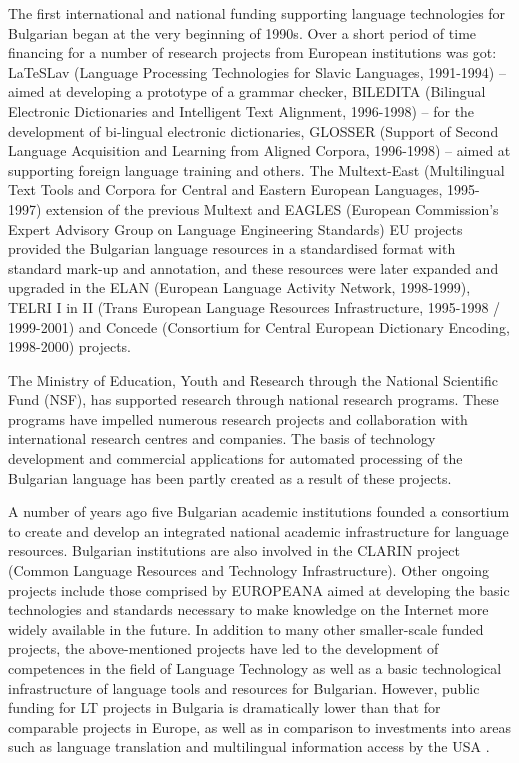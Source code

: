 \begin{multicols}{2}
The first international and national funding supporting language technologies for Bulgarian began at the very beginning of 1990s. Over a short period of time financing for a number of research projects from European institutions was got: LaTeSLav (Language Processing Technologies for Slavic Languages, 1991-1994) – aimed at developing a prototype of a grammar checker, BILEDITA (Bilingual Electronic Dictionaries and Intelligent Text Alignment, 1996-1998) – for the development of bi-lingual electronic dictionaries, GLOSSER (Support of Second Language Acquisition and Learning from Aligned Corpora, 1996-1998) – aimed at supporting foreign language training and others. The Multext-East (Multilingual Text Tools and Corpora for Central and Eastern European Languages, 1995-1997) extension of the previous Multext and EAGLES (European Commission's Expert Advisory Group on Language Engineering Standards) EU projects provided the Bulgarian language resources in a standardised format
  with standard mark-up and annotation, and these resources were later expanded and upgraded in the ELAN (European Language Activity Network, 1998-1999), TELRI I in II (Trans European Language Resources Infrastructure, 1995-1998 / 1999-2001) and Concede (Consortium for Central European Dictionary Encoding, 1998-2000) projects.

The Ministry of Education, Youth and Research through the National Scientific Fund (NSF), has supported research through national research programs. These programs have impelled numerous research projects and collaboration with international research centres and companies. The basis of technology development and commercial applications for automated processing of the Bulgarian language has been partly created as a result of these projects.

A number of years ago five Bulgarian academic institutions founded a consortium to create and develop an integrated national academic infrastructure for language resources. Bulgarian institutions are also involved in the CLARIN project (Common Language Resources and Technology Infrastructure). Other ongoing projects include those comprised by EUROPEANA aimed at developing the basic technologies and standards necessary to make knowledge on the Internet more widely available in the future. In addition to many other smaller-scale funded projects, the above-mentioned projects have led to the development of competences in the field of Language Technology as well as a basic technological infrastructure of language tools and resources for Bulgarian. However, public funding for LT projects in Bulgaria is dramatically lower than that for comparable projects in Europe, as well as in comparison to investments into areas such as language translation and multilingual information access by
  the USA \cite{sprachtech}.  



\end{multicols}
